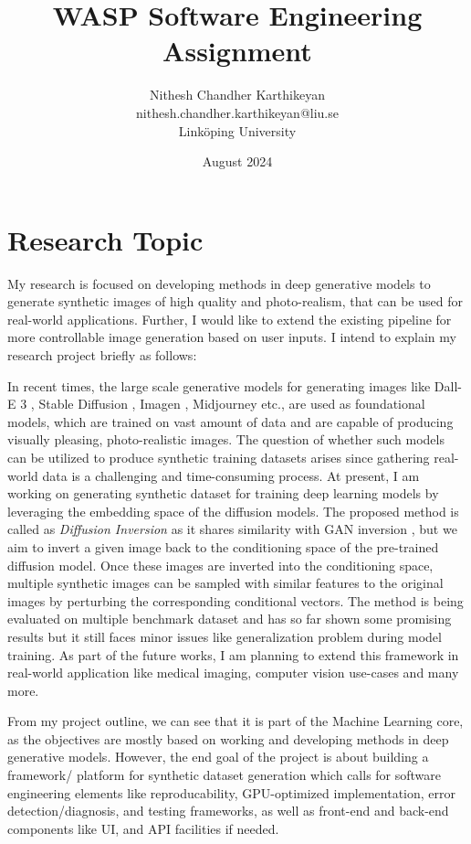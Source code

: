 \documentclass[a4paper, 11pt]{article}
\title{WASP Software Engineering Assignment}
\author{Nithesh Chandher Karthikeyan \\ nithesh.chandher.karthikeyan@liu.se \\ Linköping University}
\date{August 2024}
\begin{document}
\maketitle

\section{Research Topic}
My research is focused on developing methods in deep generative models to generate synthetic images of high quality and photo-realism, that can be used for real-world applications. Further, I would like to extend the existing pipeline for more controllable image generation based on user inputs. I intend to explain my research project briefly as follows:

In recent times, the large scale generative models for generating images like Dall-E 3 \cite{betker2023improving}, Stable Diffusion \cite{rombach2022high}, Imagen \cite{saharia2022photorealistic}, Midjourney etc., are used as foundational models, which are trained on vast amount of data and are capable of producing visually pleasing, photo-realistic images. The question of whether such models can be utilized to produce synthetic training datasets arises since gathering real-world data is a challenging and time-consuming process. At present, I am working on generating synthetic dataset for training deep learning models by leveraging the embedding space of the diffusion models. The proposed method is called as \textit{Diffusion Inversion} as it shares similarity with GAN inversion \cite{xia2022gan}, but we aim to invert a given image back to the conditioning space of the pre-trained diffusion model. Once these images are inverted into the conditioning space, multiple synthetic images can be sampled with similar features to the original images by perturbing the corresponding conditional vectors. The method is being evaluated on multiple benchmark dataset and has so far shown some promising results but it still faces minor issues like generalization problem during model training. As part of the future works, I am planning to extend this framework in real-world application like medical imaging, computer vision use-cases and many more.

From my project outline, we can see that it is part of the Machine Learning core, as the objectives are mostly based on working and developing methods in deep generative models. However, the end goal of the project is about building a framework/ platform for synthetic dataset generation which calls for software engineering elements like reproducability, GPU-optimized implementation, error detection/diagnosis, and testing frameworks, as well as front-end and back-end components like UI, and API facilities if needed.
\end{document}
